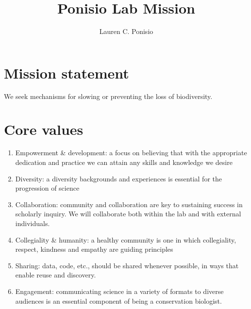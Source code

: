 \documentclass[12pt]{article}
\title{Ponisio Lab Mission}
\author{Lauren C. Ponisio}
\begin{document}
\maketitle

\section{Mission statement}
We seek mechanisms for slowing or preventing the loss of biodiversity.

\section{Core values}

\begin{enumerate}
\item Empowerment \& development: a focus on believing that with the
  appropriate dedication and practice we can attain any skills and
  knowledge we desire
\item Diversity: a diversity backgrounds and experiences is essential
  for the progression of science
\item Collaboration: community and collaboration are key to sustaining
  success in scholarly inquiry. We will collaborate both within the
  lab and with external individuals.
\item Collegiality \& humanity: a healthy community is one in which
  collegiality, respect, kindness and empathy are guiding principles
\item Sharing: data, code, etc., should be shared whenever possible,
  in ways that enable reuse and discovery.
\item Engagement: communicating science in a variety of formats to
  diverse audiences is an essential component of being a conservation
  biologist.
\end{enumerate}
\end{document}
